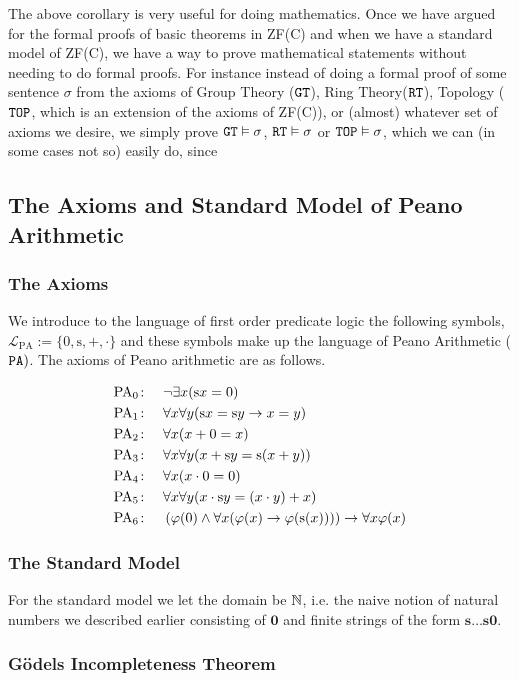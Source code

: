 The above corollary is very useful for doing mathematics. Once we have argued for the formal proofs of basic theorems in ZF(C) and when we have a standard model of ZF(C), we have a way to prove mathematical statements without needing to do formal proofs. For instance instead of doing a formal proof of some sentence $\sigma$ from the axioms of Group Theory ($\verb|GT|$), Ring Theory($\verb|RT|$), Topology ($\verb|TOP|$, which is an extension of the axioms of ZF(C)), or (almost) whatever set of axioms we desire, we simply prove $\verb|GT|\vDash \sigma$, $\verb|RT|\vDash \sigma$ or $\verb|TOP|\vDash \sigma$, which we can (in some cases not so) easily do, since  
\subsection{The Axioms and Standard Model of Peano Arithmetic}

\subsubsection{The Axioms}
We introduce to the language of first order predicate logic the following symbols, $\mathcal{L}_{\mathrm{PA}}:=\{0,\mathrm{s},+,\cdot\}$ and these symbols make up the language of Peano Arithmetic ($\verb|PA|)$. The axioms of Peano arithmetic are as follows. 
    \begin{axioms}
        \begin{align*}
            \mathrm{PA}_0\colon\quad & \neg \exists x (\mathrm{s} x = 0) \\
            \mathrm{PA}_1\colon\quad & \forall x \forall y (\mathrm{s} x = \mathrm{s} y \rightarrow x = y) \\
            \mathrm{PA}_2\colon\quad & \forall x (x + 0 = x) \\
            \mathrm{PA}_3\colon\quad & \forall x \forall y (x + \mathrm{s} y = \mathrm{s}(x + y)) \\
            \mathrm{PA}_4\colon\quad & \forall x (x \cdot 0 = 0) \\
            \mathrm{PA}_5\colon\quad & \forall x \forall y (x \cdot \mathrm{s} y = (x \cdot y) + x) \\
            \mathrm{PA}_6\colon\quad & \left( \varphi(0) \land \forall x (\varphi(x) \rightarrow \varphi(\mathrm{s} (x))) \right) \rightarrow \forall x \varphi(x)
        \end{align*}
    \end{axioms}
\subsubsection{The Standard Model}
For the standard model we let the domain be $\mathbb{N}$, i.e. the naive notion of natural numbers we described earlier consisting of $\mathbf{0}$ and finite strings of the form $\mathbf{s}\dots \mathbf{s}\mathbf{0}$. 


\subsubsection{Gödels Incompleteness Theorem}

